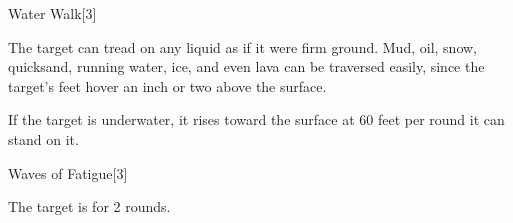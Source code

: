 \begin{spellsection}{Water Walk}[3]
    \begin{spellheader}
    \end{spellheader}
    \begin{spellcontent}
        \begin{spelltargetinginfo}
        \end{spelltargetinginfo}
        \begin{spelleffects}
            \spelleffect The target can tread on any liquid as if it were firm ground. Mud, oil, snow, quicksand, running water, ice, and even lava can be traversed easily, since the target's feet hover an inch or two above the surface.
            \par If the target is underwater, it rises toward the surface at 60 feet per round it can stand on it.
            \spelldur \durlong \dismissable
        \end{spelleffects}
    \end{spellcontent}
    \begin{spellfooter}
        \miscastexplode
    \end{spellfooter}
\end{spellsection}

\begin{spellsection}{Waves of Fatigue}[3]
    \begin{spellheader}
    \end{spellheader}
    \begin{spellcontent}
        \begin{spelltargetinginfo}
        \end{spelltargetinginfo}
        \begin{spelleffects}
            \spelleffect The target is \fatigued for 2 rounds.
        \end{spelleffects}
    \end{spellcontent}
    \begin{spellfooter}
        \miscastexplode
    \end{spellfooter}
\end{spellsection}

